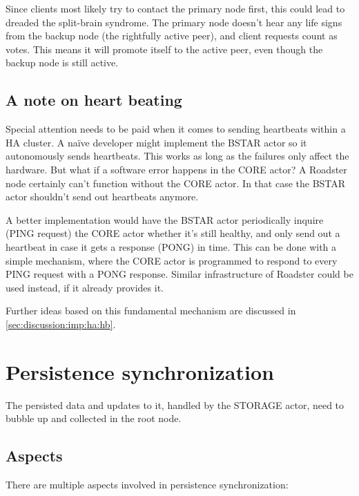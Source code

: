 Since clients most likely try to contact the primary node first, this could
lead to dreaded the split-brain syndrome. The primary node doesn't hear any
life signs from the backup node (the rightfully active peer), and client
requests count as votes. This means it will promote itself to the active peer,
even though the backup node is still active.

\subsection{A note on heart beating}\label{sec:approach:ha:hb}
Special attention needs to be paid when it comes to sending heartbeats within a
HA cluster. A na\"ive developer might implement the BSTAR actor so it
autonomously sends heartbeats. This works as long as the failures only affect
the hardware. But what if a software error happens in the CORE actor?  A
Roadster node certainly can't function without the CORE actor. In that case the
BSTAR actor shouldn't send out heartbeats anymore.

A better implementation would have the BSTAR actor periodically inquire (PING
request) the CORE actor whether it's still healthy, and only send out a
heartbeat in case it gets a response (PONG) in time. This can be done with a
simple mechanism, where the CORE actor is programmed to respond to every PING
request with a PONG response. Similar infrastructure of Roadster could be used
instead, if it already provides it.

Further ideas based on this fundamental mechanism are discussed in
\autoref{sec:discussion:imp:ha:hb}.

\section{Persistence synchronization}\label{sec:approach:psync}
The persisted data and updates to it, handled by the STORAGE actor, need to
bubble up and collected in the root node.

\subsection{Aspects}
There are multiple aspects involved in persistence synchronization:


